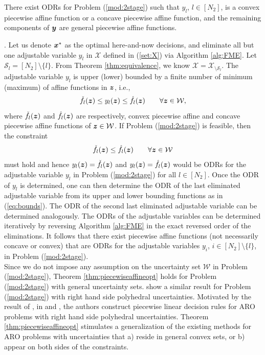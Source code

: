 \documentclass[fleqn,mnsc,blindrev]{informs4}
\newcommand{\mb}[1]{\mbox{\boldmath \ensuremath{#1}}}
\begin{document}
\begin{theorem} \label{thm:piecewiseaffineopt}
There exist ODRs for Problem (\ref{mod:2stage}) such that $y_l$, $l\in [N_2]$, is a convex piecewise affine function or a concave piecewise affine function, and the remaining components of $\mb{y}$ are general piecewise affine functions.
\end{theorem}
. Let us denote $\mb{x}^*$ as the optimal here-and-now decisions, and eliminate all but one adjustable variable $y_{l}$ in $\mathcal{X}$ defined in (\ref{set:X}) via Algorithm \ref{alg:FME}.  Let $\mathcal{S}_l=[N_2]\setminus \{l\}$. From Theorem \ref{thm:equivalence}, we know $\mathcal{X}=\mathcal{X}_{\setminus\mathcal{S}_l}$. The adjustable variable  $y_{l}$ is upper (lower) bounded by a finite number of minimum (maximum) of affine functions in $\mb{z}$, i.e.,
\begin{equation}
\label{eq:bounds}
\check{f}_l(\mb{z}) \leq y_{l}(\mb{z}) \leq \hat{f}_l(\mb{z}) \qquad \forall \mb{z} \in \mathcal{W},
\end{equation}
where $\check{f}_l(\mb{z})$ and $\hat{f}_l(\mb{z})$ are respectively, convex piecewise affine and concave piecewise affine functions of $\mb{z} \in \mathcal{W}$. If Problem (\ref{mod:2stage}) is feasible, then the constraint
\begin{equation*}
\check{f}_l(\mb{z}) \leq \hat{f}_l(\mb{z}) \qquad \forall \mb{z} \in \mathcal{W}
\end{equation*}
must hold and hence $y_{l}(\mb{z}) = \check{f}_l(\mb{z})$ and $y_{l}(\mb{z}) = \hat{f}_l(\mb{z})$ would be ODRs for the adjustable variable $y_l$ in Problem (\ref{mod:2stage}) for all $l \in [N_2]$. Once the ODR of $y_l$ is determined, one can then determine the ODR of the last eliminated adjustable variable from its upper and lower bounding functions as in (\ref{eq:bounds}).  {The ODR of the second last eliminated adjustable variable can be determined analogously. The ODRs of the adjustable variables can be determined iteratively by reversing Algorithm \ref{alg:FME} in the exact reversed order of the eliminations.} It follows that there exist piecewise affine functions (not necessarily concave or convex) that are ODRs for the adjustable variables $y_i$, $i\in [N_2]\setminus \{l\}$, in Problem (\ref{mod:2stage}). \hfill \Halmos  \\

Since we do not impose any assumption on the uncertainty set $\mathcal{W}$ in Problem (\ref{mod:2stage}), Theorem \ref{thm:piecewiseaffineopt} holds for Problem (\ref{mod:2stage}) with general uncertainty sets.  {\cite{bbm03} show a similar result for Problem (\ref{mod:2stage}) with right hand side polyhedral uncertainties. Motivated by the result of \cite{bbm03}, in \cite{bg15} and \cite{beg16}, the authors construct piecewise linear decision rules for ARO problems with right hand side polyhedral uncertainties. Theorem \ref{thm:piecewiseaffineopt} stimulates a generalization of the existing methods for ARO problems with uncertainties that a) reside in general convex sets, or b) appear on both sides of the constraints. }
\end{document}
